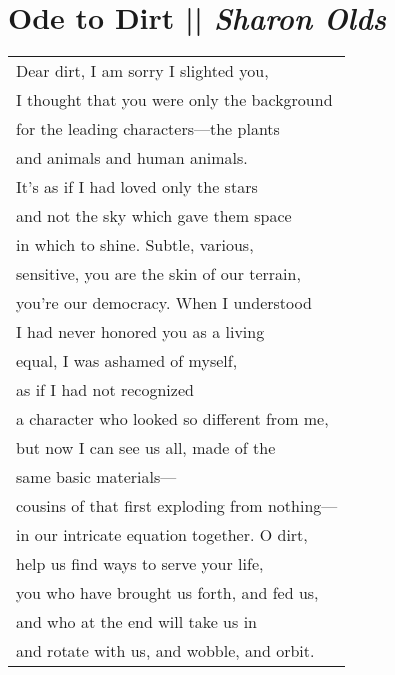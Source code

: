 
\section[Ode to Dirt]{Ode to Dirt || \emph{Sharon Olds} \hspace*{\fill}  \thepage}
\label{sec:Ode_to_Dirt.tex}
\vspace*{1cm}
\begin{center}
\begin{tabular}{l}
Dear dirt, I am sorry I slighted you,\\
I thought that you were only the background\\
for the leading characters—the plants\\
and animals and human animals.\\
It’s as if I had loved only the stars\\
and not the sky which gave them space\\
in which to shine. Subtle, various,\\
sensitive, you are the skin of our terrain,\\
you’re our democracy. When I understood\\
I had never honored you as a living\\
equal, I was ashamed of myself,\\
as if I had not recognized\\
a character who looked so different from me,\\
but now I can see us all, made of the\\
same basic materials—\\
cousins of that first exploding from nothing—\\
in our intricate equation together. O dirt,\\
help us find ways to serve your life,\\
you who have brought us forth, and fed us,\\
and who at the end will take us in\\
and rotate with us, and wobble, and orbit.
\end{tabular}
\end{center}